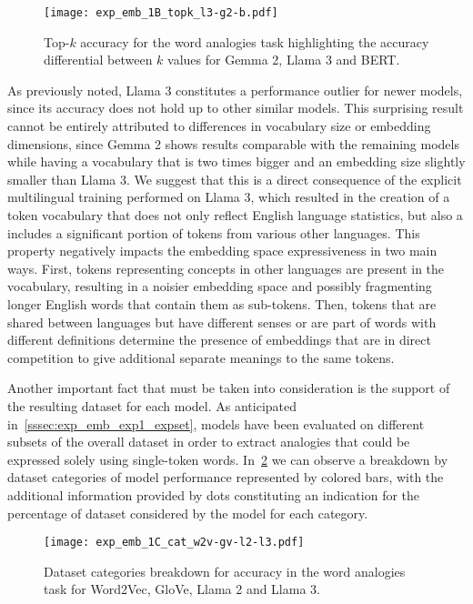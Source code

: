 \begin{figure}[t!]
    \centering
    \texttt{[image: exp\_emb\_1B\_topk\_l3-g2-b.pdf]}
    \caption[Top-$k$ accuracy for the word analogies task highlighting the accuracy differential between $k$ values for various models.]{Top-$k$ accuracy for the word analogies task highlighting the accuracy differential between $k$ values for Gemma 2, Llama 3 and BERT.}
    \label{fig:exp_emb_1_B}
\end{figure}

As previously noted, Llama 3 constitutes a performance outlier for newer models, since its accuracy does not hold up to other similar models.
This surprising result cannot be entirely attributed to differences in vocabulary size or embedding dimensions, since Gemma 2 shows results comparable with the remaining models while having a vocabulary that is two times bigger and an embedding size slightly smaller than Llama 3.
We suggest that this is a direct consequence of the explicit multilingual training performed on Llama 3, which resulted in the creation of a token vocabulary that does not only reflect English language statistics, but also a includes a significant portion of tokens from various other languages.
This property negatively impacts the embedding space expressiveness in two main ways.
First, tokens representing concepts in other languages are present in the vocabulary, resulting in a noisier embedding space and possibly fragmenting longer English words that contain them as sub-tokens.
Then, tokens that are shared between languages but have different senses or are part of words with different definitions determine the presence of embeddings that are in direct competition to give additional separate meanings to the same tokens.

Another important fact that must be taken into consideration is the support of the resulting dataset for each model.
As anticipated in~\cref{sssec:exp_emb_exp1_expset}, models have been evaluated on different subsets of the overall dataset in order to extract analogies that could be expressed solely using single-token words.
In~\cref{fig:exp_emb_1_C} we can observe a breakdown by dataset categories of model performance represented by colored bars, with the additional information provided by dots constituting an indication for the percentage of dataset considered by the model for each category.

\begin{figure}[t!]
    \centering
    \texttt{[image: exp\_emb\_1C\_cat\_w2v-gv-l2-l3.pdf]}
    \caption[Dataset categories breakdown for accuracy in the word analogies task for various models.]{Dataset categories breakdown for accuracy in the word analogies task for Word2Vec, GloVe, Llama 2 and Llama 3.}
    \label{fig:exp_emb_1_C}
\end{figure}

